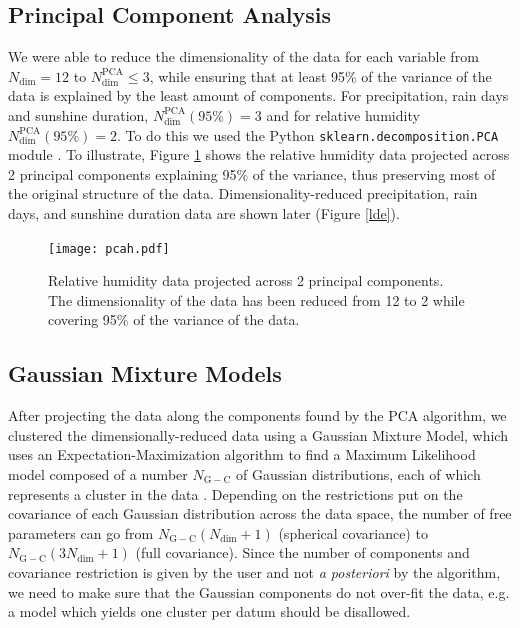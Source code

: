 \documentclass[12pt]{iopart}
\begin{document}
\subsection{Principal Component Analysis}

We were able to reduce the dimensionality of the data for each variable from  $N_\mathrm{dim}=12$ to  $N_\mathrm{dim}^\mathrm{PCA}\le3$, while ensuring that at least 95\% of the variance of the data is explained by the least amount of components. For precipitation, rain days and sunshine duration, $N_\mathrm{dim}^\mathrm{PCA}(95\%)=3$ and for relative humidity $N_\mathrm{dim}^\mathrm{PCA}(95\%)=2$. To do this we used the Python \texttt{sklearn.decomposition.PCA} module \cite{sklearn}. To illustrate, Figure \ref{pcah} shows the relative humidity data projected across 2 principal components explaining 95\% of the variance, thus preserving most of the original structure of the data. Dimensionality-reduced precipitation, rain days, and sunshine duration data are shown later (Figure \ref{lde}).

\begin{figure}
\begin{center}
\texttt{[image: pcah.pdf]}
\caption{Relative humidity data projected across 2 principal components. The dimensionality of the data has been reduced from 12 to 2 while covering 95\% of the variance of the data. }\label{pcah}
\end{center}
\end{figure}

\subsection{Gaussian Mixture Models}

After projecting the data along the components found by the PCA algorithm, we clustered the dimensionally-reduced data using a Gaussian Mixture Model, which uses an Expectation-Maximization algorithm to find a Maximum Likelihood model composed of a number $N_\mathrm{G-C}$ of Gaussian distributions, each of which represents a cluster in the data \cite{gmm}. Depending on the restrictions put on the covariance of each Gaussian distribution across the data space, the number of free parameters can go from $N_\mathrm{G-C}(N_\mathrm{dim}+1)$ (spherical covariance) to  $N_\mathrm{G-C}(3N_\mathrm{dim}+1)$ (full covariance). Since the number of components and covariance restriction is given by the user and not \emph{a posteriori} by the algorithm, we need to make sure that the Gaussian components do not over-fit the data, e.g. a model which yields one cluster per datum should be disallowed.\\
\end{document}
